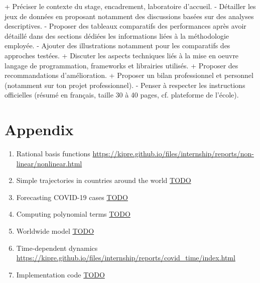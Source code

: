 \documentclass[12pt, letterpaper]{article}
\begin{document}
+ Préciser le contexte du stage, encadrement, laboratoire d'accueil.
- Détailler les jeux de données en proposant notamment des discussions basées sur des analyses descriptives.
- Proposer des tableaux comparatifs des performances après avoir détaillé dans des sections dédiées les informations liées à la méthodologie employée.
- Ajouter des illustrations notamment pour les comparatifs des approches testées.
+ Discuter les aspects techniques liés à la mise en oeuvre langage de programmation, frameworks et librairies utilisés.
+ Proposer des recommandations d'amélioration.
+ Proposer un bilan professionnel et personnel (notamment sur ton projet professionnel).
- Penser à respecter les instructions officielles (résumé en français, taille 30 à 40 pages, cf. plateforme de l'école).


\section*{Appendix}
\label{sec:appendix}

\begin{enumerate}
	\item Rational basis functions \url{https://kipre.github.io/files/internship/reports/non-linear/nonlinear.html} \label{app:rational}
	\item Simple trajectories in countries around the world \url{TODO} \label{app:all-countries}
	\item Forecasting COVID-19 cases \url{TODO} \label{app:forecast}
	\item Computing polynomial terms \url{TODO} \label{app:polynomials}
	\item Worldwide model \url{TODO} \label{app:global}
	\item Time-dependent dynamics \url{https://kipre.github.io/files/internship/reports/covid_time/index.html} \label{app:time-dependent}
	\item Implementation code \url{TODO} \label{app:code}
\end{enumerate}
\end{document}
